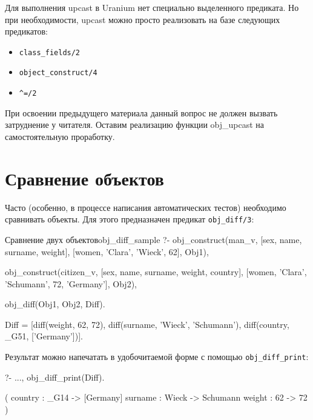 \documentclass[a4paper]{book}
\def\ur{Uranium}
\begin{document}
Для выполнения upcast в \ur{} нет специально выделенного
предиката. Но при необходимости, upcast можно просто реализовать
на базе следующих предикатов:

\begin{itemize}
\item \verb|class_fields/2|
\item \verb|object_construct/4|
\item \verb|^=/2|
\end{itemize}


При освоении предыдущего материала данный вопрос не должен
вызвать затруднение у читателя. Оставим реализацию функции
obj_upcast на самостоятельную проработку. 

\section{Сравнение объектов}
\label{obj_diff}

Часто (особенно, в процессе написания автоматических тестов)
необходимо сравнивать объекты. Для этого предназначен предикат
\verb|obj_diff/3|:

\begin{example}{Сравнение двух объектов}{obj_diff_sample}
?- obj_construct(man_v, 
      [sex, name, surname, weight], 
      [women, 'Clara', 'Wieck', 62], Obj1), 
   
   obj_construct(citizen_v, 
      [sex, name, surname, weight, country], 
      [women, 'Clara', 'Schumann', 72, 'Germany'], Obj2), 

   obj_diff(Obj1, Obj2, Diff).

Diff = [diff(weight, 62, 72), diff(surname, 'Wieck', 'Schumann'), diff(country, _G51, ['Germany'])].
\end{example}



Результат можно напечатать в удобочитаемой форме с помощью
\verb|obj_diff_print|:

\begin{example}{}{}
?- ..., obj_diff_print(Diff).

( 
  country : _G14 -> [Germany] 
  surname : Wieck -> Schumann 
  weight : 62 -> 72 
) 
\end{example}
\end{document}
